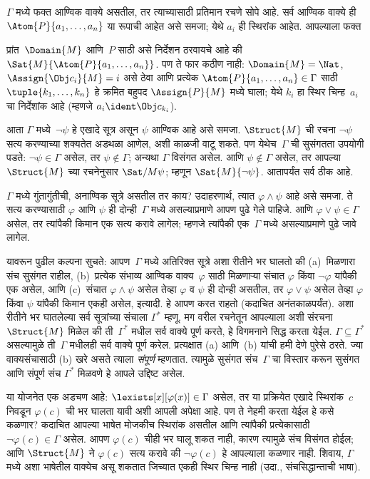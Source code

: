$\Gamma$ मध्ये फक्त आण्विक
  वाक्ये असतील, तर त्याच्यासाठी
प्रतिमान रचणे सोपे आहे. सर्व आण्विक वाक्ये ही
  $\Atom{P}{a_1,\dots,a_n}$ या रूपाची आहेत असे समजा; येथे $a_i$ ही
  स्थिरांक आहेत. आपल्याला फक्त

  प्रांत~$\Domain{M}$ आणि~$P$ साठी असे निर्देशन ठरवायचे आहे की
  $\Sat{M}{\Atom{P}{a_1,\ldots,a_n}}$. पण ते फार कठीण नाही:
  $\Domain{M} = \Nat$, $\Assign{\Obj c_i}{M} = i$ असे ठेवा आणि प्रत्येक
  $\Atom{P}{a_1,\ldots,a_n} \in \Gamma$ साठी $\tuple{k_1,
    \dots, k_n}$ हे क्रमित बहुपद $\Assign{P}{M}$ मध्ये घाला; येथे $k_i$
  हा स्थिर चिन्ह~$a_i$ चा निर्देशांक आहे (म्हणजे $a_i \ident \Obj
  c_{k_i}$).

आता $\Gamma$ मध्ये~$\lnot \psi$ हे एखादे सूत्र असून $\psi$ आण्विक आहे
असे समजा. $\Struct{M}$ ची रचना $\lnot \psi$ सत्य
करण्याच्या शक्यतेत अडथळा आणेल, अशी काळजी वाटू शकते. पण येथेच~$\Gamma$ ची
सुसंगतता उपयोगी पडते: $\lnot \psi \in \Gamma$ असेल, तर $\psi \notin \Gamma$;
अन्यथा $\Gamma$ विसंगत असेल. आणि $\psi \notin \Gamma$ असेल, तर आपल्या
$\Struct{M}$ च्या रचनेनुसार
$\Sat/{M}{\psi}$; म्हणून
$\Sat{M}{\lnot \psi}$. आतापर्यंत सर्व ठीक आहे.

$\Gamma$ मध्ये गुंतागुंतीची, अनाण्विक सूत्रे असतील तर काय? उदाहरणार्थ,
त्यात $\varphi \land \psi$ आहे असे समजा. ते सत्य करण्यासाठी $\varphi$ आणि $\psi$ ही
दोन्ही~$\Gamma$ मध्ये असल्याप्रमाणे आपण पुढे गेले पाहिजे. आणि $\varphi \lor
\psi \in \Gamma$ असेल, तर त्यांपैकी किमान एक सत्य करावे लागेल; म्हणजे
त्यांपैकी एक~$\Gamma$ मध्ये असल्याप्रमाणे पुढे जावे लागेल.

यावरून पुढील कल्पना सुचते: आपण~$\Gamma$ मध्ये अतिरिक्त सूत्रे
अशा रीतीने भर घालतो की (a)~मिळणारा संच सुसंगत राहील, (b)~प्रत्येक
संभाव्य आण्विक वाक्य~$\varphi$ साठी मिळणाऱ्या संचात $\varphi$ किंवा
$\lnot \varphi$ यांपैकी एक असेल, आणि (c)~संचात $\varphi \land \psi$ असेल तेव्हा
$\varphi$ व $\psi$ ही दोन्ही असतील, तर $\varphi \lor \psi$ असेल तेव्हा $\varphi$ किंवा
$\psi$ यांपैकी किमान एकही असेल, इत्यादी. हे आपण करत राहतो (कदाचित
अनंतकाळपर्यंत). अशा रीतीने भर घातलेल्या सर्व सूत्रांच्या संचाला
$\Gamma^*$ म्हणू. मग वरील रचनेतून आपल्याला अशी
संरचना~$\Struct{M}$
मिळेल की ती~$\Gamma^*$ मधील सर्व वाक्ये पूर्ण करते, हे विगमनाने सिद्ध
करता येईल. $\Gamma \subseteq \Gamma^*$ असल्यामुळे ती~$\Gamma$ मधीलही
सर्व वाक्ये पूर्ण करेल. प्रत्यक्षात (a) आणि~(b) यांची हमी देणे पुरेसे
ठरते. ज्या वाक्यसंचासाठी (b) खरे असते त्याला \emph{संपूर्ण} म्हणतात.
त्यामुळे सुसंगत संच~$\Gamma$ चा विस्तार करून सुसंगत आणि संपूर्ण संच
$\Gamma^*$ मिळवणे हे आपले उद्दिष्ट असेल.


या योजनेत एक अडचण आहे: $\lexists[x][\varphi(x)] \in \Gamma$ असेल, तर या
प्रक्रियेत एखादे स्थिरांक~$c$ निवडून $\varphi(c)$ ची भर घालता यावी अशी
आपली अपेक्षा आहे. पण ते नेहमी करता येईल हे कसे कळणार? कदाचित आपल्या
भाषेत मोजकीच स्थिरांक असतील आणि त्यांपैकी प्रत्येकासाठी
$\lnot \varphi(c) \in \Gamma$ असेल. आपण $\varphi(c)$ चीही भर घालू शकत नाही,
कारण त्यामुळे संच विसंगत होईल; आणि $\Struct{M}$ ने $\varphi(c)$ सत्य करावे की
$\lnot \varphi(c)$ हे आपल्याला कळणार नाही. शिवाय, $\Gamma$ मध्ये अशा भाषेतील
वाक्येच असू शकतात जिच्यात एकही स्थिर चिन्ह नाही (उदा., संचसिद्धान्ताची
भाषा).

